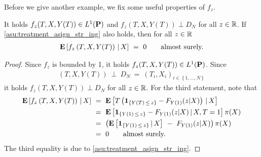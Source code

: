Before we give another example, we fix some useful properties of $f_z$.
\begin{lemma}
    \label{lem:f_z}
    It holds
    $f_z(T,X,Y(T))\in L^1(\P)$
    and 
    $f_z(T,X,Y(T))\perp D_N$
    for all $z\in\R$.
    If \eqref{asu:treatment_asign_str_ing} also holds,
    then 
    for all $z\in\R$
    \begin{gather*}
      \E
      \left[
        f_z
        \left( 
          T,
          X,
          Y(T)
        \right)
        \,
        |
        \,
        X
      \right]
      \ 
      =
      \ 
      0
      \qquad
      \text{almost surely.}
    \end{gather*}
  \end{lemma}
  \begin{proof}
    Since $f_z$ is bounded by 1,
    it holds
    $f_z(T,X,Y(T))\in L^1(\P)$.
    Since
    \begin{gather*}
    (T,X,Y(T))
    \ 
    \perp 
    \ 
    D_N
    \ 
    =
    \ 
    (T_i,X_i)_{i\in \left\{ 1,\ldots,N \right\}}
    \end{gather*}
    it holds
    $f_z(T,X,Y(T))\perp D_N$
    for all $z\in\R$.
    For the third statement, note that
    \begin{align*}
      \E
      \left[
        f_z
        \left( 
          T,
          X,
          Y(T)
        \right)
        \,
        |
        \,
        X
      \right]
      &
      \ 
      =
      \ 
      \E
      \left[
      T
      \left( 
        \mathbf{1}
        _{\left\{  Y(T)\,\le\,z \right\}}
        -
        F_{Y(1)}(z|X)
      \right)
        \,
        |
        \,
        X
      \right]
      \\
      &
      \ 
      =
      \ 
      \E
      \left[
        \mathbf{1}
        _{\left\{  Y(1)\,\le\,z \right\}}
        -
        F_{Y(1)}(z|X)
        \,
        |
        \,
        X
        ,
        T=1
      \right]
      \pi(X)
      \\
      &
      \ 
      =
      \ 
      \left( 
      \E
      \left[
        \mathbf{1}
        _{\left\{  Y(1)\,\le\,z \right\}}
        \,
        |
        \,
        X
      \right]
      \ 
        -
      \ 
        F_{Y(1)}(z|X)
      \right)
      \pi(X)
      \\
      &
      \ 
      =
      \ 
      0
      \qquad
      \text{almost surely.}
    \end{align*}
    The third equality is due to \eqref{asu:treatment_asign_str_ing}.
  \end{proof}

